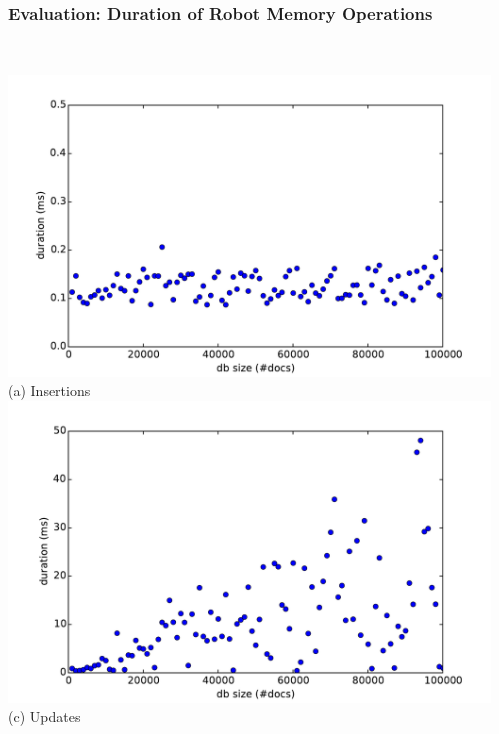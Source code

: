 \begin{frame}
  \frametitle{Evaluation: Duration of Robot Memory Operations}
  \centering
  \begin{columns}
    \begin{column}{0.55\textwidth}
  \centering
    \\\vspace{-0.08cm}
    \includegraphics[width=\textwidth]{../thesis/plots/insert-durations}\\
    (a) Insertions
    \\\vspace{-0.08cm}
    \includegraphics[width=\textwidth]{../thesis/plots/update-durations}\\
    (c) Updates
    \end{column}
    \begin{column}{0.55\textwidth}
  \centering
    \\\vspace{-0.08cm}

\end{column}
\end{columns}
\end{frame}
